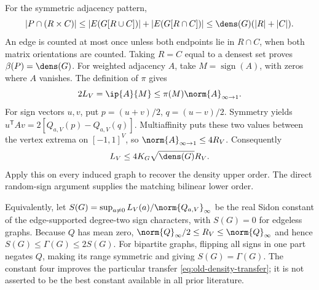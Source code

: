 For the symmetric adjacency pattern,
\[
 |P\cap(R\times C)|\le|E(G[R\cup C])|+|E(G[R\cap C])|
                   \le\dens(G)(|R|+|C|).
\]
An edge is counted at most once unless both endpoints lie in $R\cap C$,
when both matrix orientations are counted. Taking $R=C$ equal to a densest
set proves $\beta(P)=\dens(G)$. For weighted adjacency $A$, take
$M=\operatorname{sign}(A)$, with zeros where $A$ vanishes. The definition
of $\pi$ gives
\[
 2L_V=\ip{A}{M}\le\pi(M)\norm{A}_{\infty\to1}.
\]
For sign vectors $u,v$, put $p=(u+v)/2$, $q=(u-v)/2$. Symmetry yields
$u^{\mathsf T}Av=2[Q_{a,V}(p)-Q_{a,V}(q)]$. Multiaffinity puts these two
values between the vertex extrema on $[-1,1]^V$, so
$\norm{A}_{\infty\to1}\le4R_V$. Consequently
\begin{equation}\label{eq:old-density-transfer}
 L_V\le4K_G\sqrt{\dens(G)}R_V.
\end{equation}
Apply this on every induced graph to recover the density upper order.
The direct random-sign argument supplies the matching bilinear lower order.

Equivalently, let
$S(G)=\sup_{a\ne0}L_V(a)/\norm{Q_{a,V}}_\infty$ be the real Sidon
constant of the edge-supported degree-two sign characters, with $S(G)=0$
for edgeless graphs. Because $Q$
has mean zero,
$\norm{Q}_\infty/2\le R_V\le\norm{Q}_\infty$ and hence
$S(G)\le\Gamma(G)\le2S(G)$. For bipartite graphs, flipping all signs in
one part negates $Q$, making its range symmetric and giving
$S(G)=\Gamma(G)$. The constant four improves the particular transfer
\eqref{eq:old-density-transfer}; it is not asserted to be the best constant
available in all prior literature.
